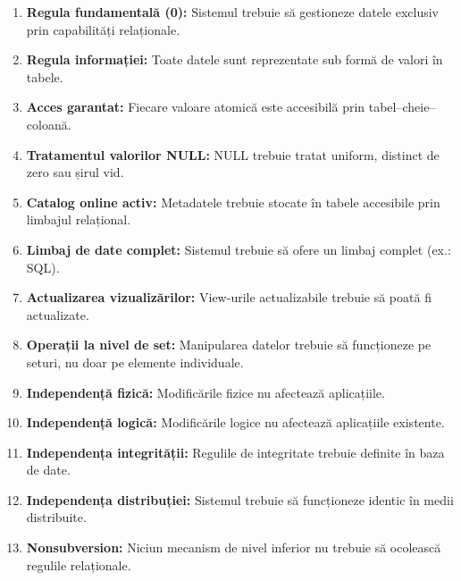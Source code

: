 \documentclass[12pt,a4paper]{article}
\begin{document}
\begin{enumerate}[label=\textbf{Regula \arabic*:}, leftmargin=2cm]
    \item \textbf{Regula fundamentală (0):} Sistemul trebuie să gestioneze datele exclusiv prin capabilități relaționale.
    \item \textbf{Regula informației:} Toate datele sunt reprezentate sub formă de valori în tabele.
    \item \textbf{Acces garantat:} Fiecare valoare atomică este accesibilă prin tabel--cheie--coloană.
    \item \textbf{Tratamentul valorilor NULL:} NULL trebuie tratat uniform, distinct de zero sau șirul vid.
    \item \textbf{Catalog online activ:} Metadatele trebuie stocate în tabele accesibile prin limbajul relațional.
    \item \textbf{Limbaj de date complet:} Sistemul trebuie să ofere un limbaj complet (ex.: SQL).
    \item \textbf{Actualizarea vizualizărilor:} View-urile actualizabile trebuie să poată fi actualizate.
    \item \textbf{Operații la nivel de set:} Manipularea datelor trebuie să funcționeze pe seturi, nu doar pe elemente individuale.
    \item \textbf{Independență fizică:} Modificările fizice nu afectează aplicațiile.
    \item \textbf{Independență logică:} Modificările logice nu afectează aplicațiile existente.
    \item \textbf{Independența integrității:} Regulile de integritate trebuie definite în baza de date.
    \item \textbf{Independența distribuției:} Sistemul trebuie să funcționeze identic în medii distribuite.
    \item \textbf{Nonsubversion:} Niciun mecanism de nivel inferior nu trebuie să ocolească regulile relaționale.
\end{enumerate}
\end{document}
